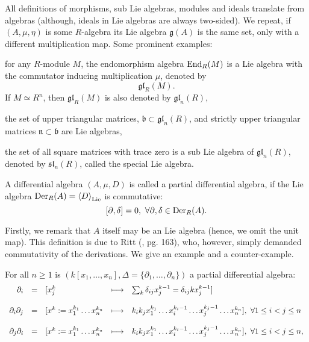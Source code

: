 \bmk All definitions of morphisms, sub Lie algebras, modules and ideals translate from algebras (although, ideals in Lie algebras are always two-sided). We repeat, if $(A, \mu, \eta)$ is some $R$-algebra its Lie algebra $\mathfrak{g}(A)$ is the same set, only with a different multiplication map.
\bsp Some prominent examples:
\bn
\item for any $R$-module $M$, the endomorphism algebra $\trm{End}_R(M)$ is a Lie algebra with the commutator inducing multiplication $\mu$, denoted by
$$\mathfrak{gl}_R(M).$$
If $M \simeq R^n$, then $\mathfrak{gl}_R(M)$ is also denoted by $\mathfrak{gl}_n(R)$,
\item the set of upper triangular matrices, $\mathfrak{b} \subset \mathfrak{gl}_n(R)$, and strictly upper triangular matrices $\mathfrak{n} \subset \mathfrak{b}$ are Lie algebras,
\item the set of all square matrices with trace zero is a sub Lie algebra of $\mathfrak{gl}_n(R)$, denoted by $\mathfrak{sl}_n(R)$, called the special Lie algebra.
\en
\begin{defi}\label{PartialDiff}
A differential algebra $(A,\mu,D)$ is called a partial differential algebra, if the Lie algebra $\trm{Der}_R(A) = \left<D\right>_{\trm{Lie}}$ is commutative:
$$[\partial,\delta] = 0,\ \forall \partial, \delta \in \trm{Der}_R(A).$$
\end{defi}
Firstly, we remark that $A$ itself may be an Lie algebra (hence, we omit the unit map). This definition is due to Ritt (\cite{Ritt}, pg. 163), who, however, simply demanded commutativity of the derivations.
\bsp \label{partial_diff_alg_examp}We give an example and a counter-example.
\bn
\item\label{partial_diff_exp01} For all $n \geq 1$ is $(k[x_1,\ldots,x_n], \Delta = \{\partial_1,\ldots,\partial_n\})$ a partial differential algebra:
$$\bao{rclcl}
\partial_i &=& [x_{j}^{k} &\longmapsto& \sum_{k} \delta_{ij} x_j^{k-1} = \delta_{ij} k x_j^{k-1}]\\
&&&&\\
\partial_i \partial_j &=& [x^k := x_1^{k_1} \ldots x_n^{k_n} &\longmapsto & k_i k_j x_1^{k_1}\ldots x_i^{k_i - 1} \ldots x_j^{k_j-1} \ldots x_n^{k_n}],\ \forall 1 \leq i < j \leq n\\
&&&&\\
\partial_j \partial_i &=& [x^k := x_1^{k_1} \ldots x_n^{k_n} &\longmapsto & k_i k_j x_1^{k_1}\ldots x_i^{k_i - 1} \ldots x_j^{k_j-1} \ldots x_n^{k_n}],\ \forall 1 \leq i < j \leq n,\\
\ea$$
